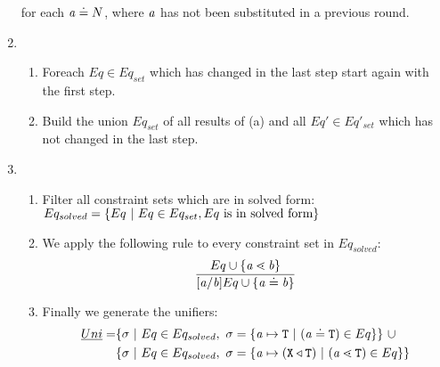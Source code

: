 \begin{enumerate}
      for each $\mathit{ a } \doteq N$, where $\mathit{ a }$ has not been substituted in a previous round.

\item 
    \begin{enumerate}
    \item Foreach $Eq \in Eq_{set}$ which has changed in the last step
      start again with the first step.
    \item Build the union $Eq_{set}$ of all results of (a) and all $Eq' \in
      Eq'_{set}$ which has not changed in the last step.
    \end{enumerate}
\item
\begin{enumerate}
  \item Filter all constraint sets which are in solved
  form:\\
$Eq_{solved} = \{  Eq \ | \ Eq \in Eq_{set}, Eq \ \text{is in solved form} \}$
\item We apply the following rule to every constraint set in $Eq_{solved}$:
\begin{align*}
\ddfrac{
  Eq \cup \set{ \tv{a} \lessdot \tv{b} } %
}{
  [\tv{a}/\tv{b}]Eq \cup \set{ \tv{a} \doteq \tv{b} }
}
\end{align*}
\item Finally we generate the unifiers:
\begin{align*}
    \emph{Uni} = &
   \{ \sigma \ | \ Eq \in Eq_{solved},\ \sigma = \{ \mathit{ a } \mapsto \texttt{T} \ | \ (\mathit{ a } \doteq \texttt{T}) \in Eq \}  \} \ \cup \\
   & \{ \sigma \ | \ Eq \in Eq_{solved},\ \sigma = \{ \mathit{ a } \mapsto (\texttt{X} \triangleleft \texttt{T}) \ | \ (\mathit{ a } \lessdot \texttt{T}) \in Eq \}  \}
\end{align*}
\end{enumerate}
\end{enumerate}

